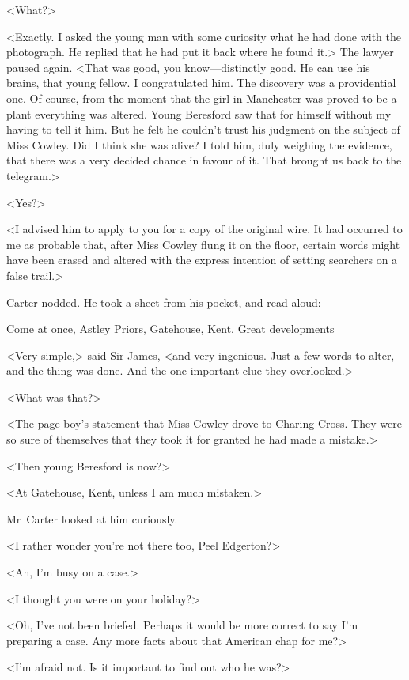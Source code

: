 <What?>

<Exactly. I asked the young man with some curiosity what he had done with the photograph. He replied that he had put it back where he found it.> The lawyer paused again. <That was good, you know—distinctly good. He can use his brains, that young fellow. I congratulated him. The discovery was a providential one. Of course, from the moment that the girl in Manchester was proved to be a plant everything was altered. Young Beresford saw that for himself without my having to tell it him. But he felt he couldn't trust his judgment on the subject of Miss Cowley. Did I think she was alive? I told him, duly weighing the evidence, that there was a very decided chance in favour of it. That brought us back to the telegram.>

<Yes?>

<I advised him to apply to you for a copy of the original wire. It had occurred to me as probable that, after Miss Cowley flung it on the floor, certain words might have been erased and altered with the express intention of setting searchers on a false trail.>

Carter nodded. He took a sheet from his pocket, and read aloud:

\begin{telegram}[Tommy.]
Come at once, Astley Priors, Gatehouse, Kent. Great developments
\end{telegram}

<Very simple,> said Sir James, <and very ingenious. Just a few words to alter, and the thing was done. And the one important clue they overlooked.>

<What was that?>

<The page-boy's statement that Miss Cowley drove to Charing Cross. They were so sure of themselves that they took it for granted he had made a mistake.>

<Then young Beresford is now?>

<At Gatehouse, Kent, unless I am much mistaken.>

Mr~Carter looked at him curiously.

<I rather wonder you're not there too, Peel Edgerton?>

<Ah, I'm busy on a case.>

<I thought you were on your holiday?>

<Oh, I've not been briefed. Perhaps it would be more correct to say I'm preparing a case. Any more facts about that American chap for me?>

<I'm afraid not. Is it important to find out who he was?>

